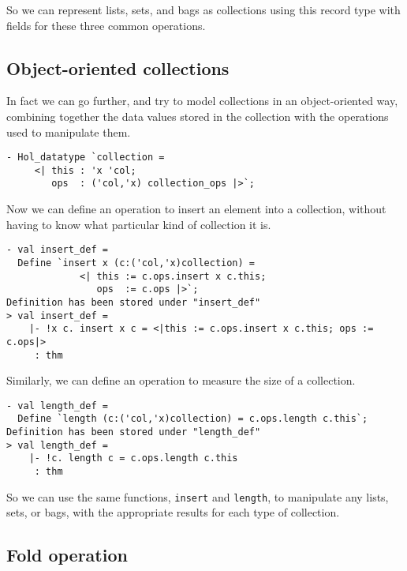 So we can represent lists, sets, and bags as collections using this
record type with fields for these three common operations.

\subsection{Object-oriented collections}

In fact we can go further, and try to model collections in an object-oriented way,
combining together the data values stored in the collection with the operations
used to manipulate them.

\begin{session}
\begin{verbatim}
- Hol_datatype `collection =
     <| this : 'x 'col;
        ops  : ('col,'x) collection_ops |>`;
\end{verbatim}
\end{session}

Now we can define an operation to insert an element into a collection,
without having to know what particular kind of collection it is.
\begin{session}
\begin{verbatim}
- val insert_def =
  Define `insert x (c:('col,'x)collection) =
             <| this := c.ops.insert x c.this;
                ops  := c.ops |>`;
Definition has been stored under "insert_def"
> val insert_def =
    |- !x c. insert x c = <|this := c.ops.insert x c.this; ops := c.ops|>
     : thm
\end{verbatim}
\end{session}

Similarly, we can define an operation to measure the size of a collection.
\begin{session}
\begin{verbatim}
- val length_def =
  Define `length (c:('col,'x)collection) = c.ops.length c.this`;
Definition has been stored under "length_def"
> val length_def =
    |- !c. length c = c.ops.length c.this
     : thm
\end{verbatim}
\end{session}
So we can use the same functions, \texttt{insert} and \texttt{length},
to manipulate any lists, sets, or bags, with the appropriate results for each
type of collection.

\subsection{Fold operation}

